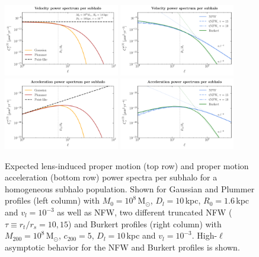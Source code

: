 \documentclass[twocolumn]{aastex63}
\begin{document}
\begin{figure}[htbp]
  \centering
  \includegraphics[width=0.45\textwidth]{plots/mu_single_1}
  \includegraphics[width=0.45\textwidth]{plots/mu_single_2}
  \includegraphics[width=0.45\textwidth]{plots/alpha_single_1}
  \includegraphics[width=0.45\textwidth]{plots/alpha_single_2}
  \caption{Expected lens-induced proper motion (top row) and proper motion acceleration (bottom row) power spectra per subhalo for a homogeneous subhalo population. Shown for Gaussian and Plummer profiles (left column) with $M_0 = 10^{8}$\,M$_\odot$, $D_l=10$\,kpc, $R_0=1.6$\,kpc and $v_l=10^{-3}$ as well as NFW, two different truncated NFW ($\tau \equiv r_t/r_s = 10, 15$) and Burkert profiles (right column) with $M_{200}=10^{8}$\,M$_\odot$, $c_{200}=5$, $D_l=10$\,kpc and $v_l=10^{-3}$. High-$\ell$ asymptotic behavior for the NFW and Burkert profiles is shown.} 
  \label{fig:single_sub}
\end{figure}
\end{document}
